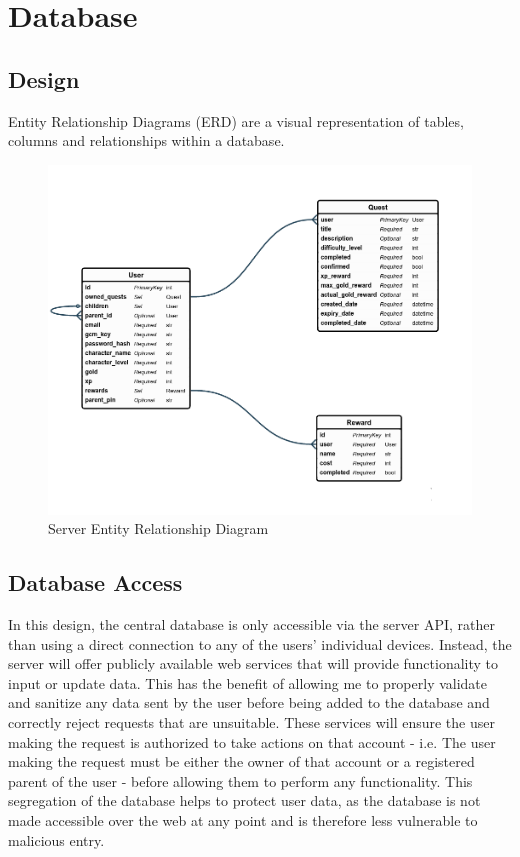 \section{Database}
\subsection{Design}
Entity Relationship Diagrams (ERD) are a visual representation of tables, columns and relationships within a database.

\begin{figure}[ht]
	\centering
	\includegraphics[scale=0.25]{images/entityRelationshipDiagram.png}
	\caption{Server Entity Relationship Diagram}
	\label{fig:erd}
\end{figure} 

\subsection{Database Access}
In this design, the central database is only accessible via the server API, rather than using a direct connection to any of the users' individual devices.
Instead, the server will offer publicly available web services that will provide functionality to input or update data. 
This has the benefit of allowing me to properly validate and sanitize any data sent by the user before being added to the database and correctly reject requests that are unsuitable. 
These services will ensure the user making the request is authorized to take actions on that account - i.e. The user making the request must be either the owner of that account or a registered parent of the user - before allowing them to perform any functionality.
This segregation of the database helps to protect user data, as the database is not made accessible over the web at any point and is therefore less vulnerable to malicious entry.

